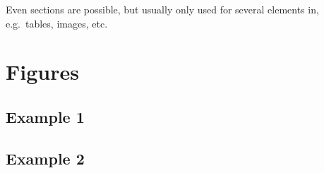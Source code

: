 \begin{comment}
\begin{figure}[H]
  \centering
  \texttt{[image: models\_state\_of\_the\_art/DCAN\_model.pdf]}
  \caption{DCAN architecture proposed by Li et al \cite{li2020}}
  \label{fig:DCAN_model}
\end{figure}
\end{comment}




Even sections are possible, but usually only used for several elements in, e.g.\ tables, images, etc.

\chapter{Figures}
\section{Example 1}
\cmark
\section{Example 2}
\xmark